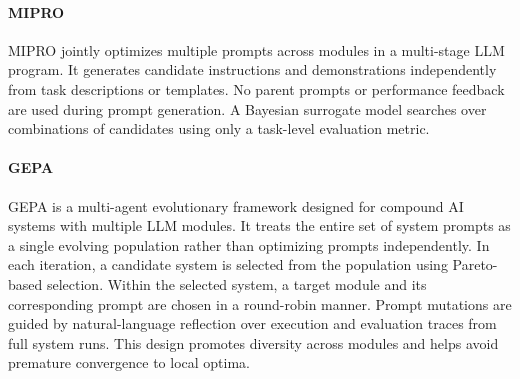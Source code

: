 \documentclass[12pt]{article}
\begin{document}
\paragraph{MIPRO}
MIPRO jointly optimizes multiple prompts across modules in a multi-stage LLM program.
It generates candidate instructions and demonstrations independently from task descriptions or templates.
No parent prompts or performance feedback are used during prompt generation.
A Bayesian surrogate model searches over combinations of candidates using only a task-level evaluation metric.

\paragraph{GEPA}
GEPA is a multi-agent evolutionary framework designed for compound AI systems with multiple LLM modules.  
It treats the entire set of system prompts as a single evolving population rather than optimizing prompts independently.  
In each iteration, a candidate system is selected from the population using Pareto-based selection.  
Within the selected system, a target module and its corresponding prompt are chosen in a round-robin manner.  
Prompt mutations are guided by natural-language reflection over execution and evaluation traces from full system runs.  
This design promotes diversity across modules and helps avoid premature convergence to local optima.


  
    
\end{document}
